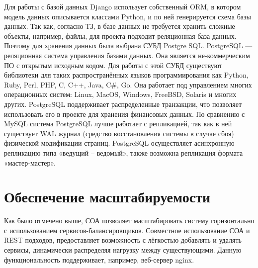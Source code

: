 \documentclass{bmstu-gost-7-32}
\begin{document}
Для работы с базой данных Django использует собственный ORM, в котором модель данных описывается классами Python, и по ней генерируется схема базы данных.
Так как, согласно ТЗ, в базе данных не требуется хранить сложные объекты, например, файлы, для проекта подходит реляционная база данных.
Поэтому для хранения данных была выбрана СУБД Postgre SQL.
PostgreSQL — реляционная система управления базами данных.
Она является не-коммерческим ПО с открытым исходным кодом.
Для работы с этой СУБД существуют библиотеки для таких распространённых языков программирования как Python, Ruby, Perl, PHP, C, C++, Java, C\#, Go.
Она работает под управлением многих операционных систем: Linux, MacOS, Windows, FreeBSD, Solaris и многих других.
PostgreSQL поддерживает распределенные транзакции, что позволяет использовать его в проекте для хранения финансовых данных.
По сравнению с MySQL система PostgreSQL лучше работает с репликацией, так как в ней существует WAL журнал (средство восстановления системы в случае сбоя) физической модификации страниц.
PostgreSQL осуществляет асинхронную репликацию типа «ведущий – ведомый», также возможна репликация формата «мастер-мастер».

\section{Обеспечение масштабируемости}

Как было отмечено выше, СОА позволяет масштабировать систему горизонтально с использованием сервисов-балансировщиков.
Совместное использование СОА и REST подходов, предоставляет возможность с лёгкостью добавлять и удалять сервисы, динамически распределяя нагрузку между существующими.
Данную функциональность поддерживает, например, веб-сервер nginx.
\end{document}
